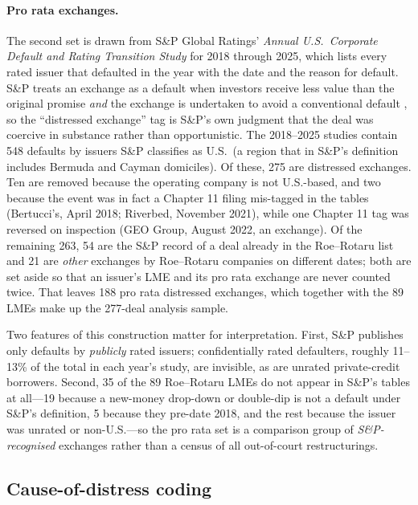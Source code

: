 \documentclass[12pt]{article}
\begin{document}
\paragraph{Pro rata exchanges.} The second set is drawn from S\&P Global Ratings' \emph{Annual U.S.\ Corporate Default and Rating Transition Study} for 2018 through 2025, which lists every rated issuer that defaulted in the year with the date and the reason for default. S\&P treats an exchange as a default when investors receive less value than the original promise \emph{and} the exchange is undertaken to avoid a conventional default \citep[the ``distressed exchange'' criteria; see][]{roerotaru2026}, so the ``distressed exchange'' tag is S\&P's own judgment that the deal was coercive in substance rather than opportunistic. The 2018--2025 studies contain 548 defaults by issuers S\&P classifies as U.S.\ (a region that in S\&P's definition includes Bermuda and Cayman domiciles). Of these, 275 are distressed exchanges. Ten are removed because the operating company is not U.S.-based, and two because the event was in fact a Chapter 11 filing mis-tagged in the tables (Bertucci's, April 2018; Riverbed, November 2021), while one Chapter 11 tag was reversed on inspection (GEO Group, August 2022, an exchange). Of the remaining 263, 54 are the S\&P record of a deal already in the Roe--Rotaru list and 21 are \emph{other} exchanges by Roe--Rotaru companies on different dates; both are set aside so that an issuer's LME and its pro rata exchange are never counted twice. That leaves 188 pro rata distressed exchanges, which together with the 89 LMEs make up the 277-deal analysis sample.

Two features of this construction matter for interpretation. First, S\&P publishes only defaults by \emph{publicly} rated issuers; confidentially rated defaulters, roughly 11--13\% of the total in each year's study, are invisible, as are unrated private-credit borrowers. Second, 35 of the 89 Roe--Rotaru LMEs do not appear in S\&P's tables at all---19 because a new-money drop-down or double-dip is not a default under S\&P's definition, 5 because they pre-date 2018, and the rest because the issuer was unrated or non-U.S.---so the pro rata set is a comparison group of \emph{S\&P-recognised} exchanges rather than a census of all out-of-court restructurings.

\subsection{Cause-of-distress coding}
\end{document}
